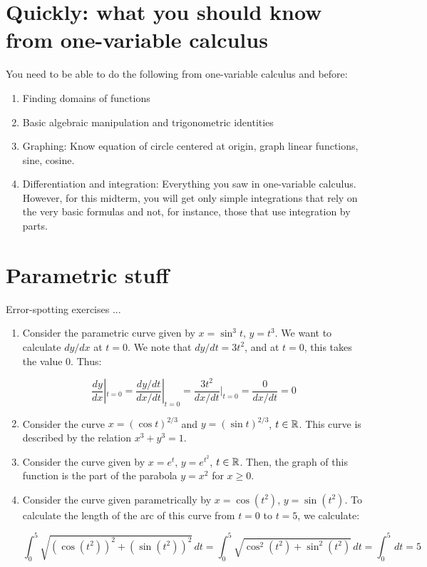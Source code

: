 \documentclass[10pt]{amsart}
\begin{document}
\section{Quickly: what you should know from one-variable calculus}

You need to be able to do the following from one-variable calculus and
before:

\begin{enumerate}
\item Finding domains of functions
\item Basic algebraic manipulation and trigonometric identities
\item Graphing: Know equation of circle centered at origin, graph
  linear functions, sine, cosine.
\item Differentiation and integration: Everything you saw in
  one-variable calculus. However, for this midterm, you will get only
  simple integrations that rely on the very basic formulas and not,
  for instance, those that use integration by parts.
\end{enumerate}

\section{Parametric stuff}

Error-spotting exercises ...

\begin{enumerate}
\item Consider the parametric curve given by $x = \sin^3 t$, $y =
  t^3$. We want to calculate $dy/dx$ at $t = 0$. We note that $dy/dt =
  3t^2$, and at $t = 0$, this takes the value $0$. Thus:

  $$\frac{dy}{dx}|_{t = 0} = \frac{dy/dt}{dx/dt}|_{t = 0} = \frac{3t^2}{dx/dt}|_{t = 0} = \frac{0}{dx/dt} = 0$$

\item Consider the curve $x = (\cos t)^{2/3}$ and $y = (\sin
  t)^{2/3}$, $t \in \mathbb{R}$. This curve is described by the relation $x^3
  + y^3 = 1$.

\item Consider the curve given by $x = e^t$, $y = e^{t^2}$, $t \in
  \mathbb{R}$. Then, the graph of this function is the part of the parabola $y =
  x^2$ for $x \ge 0$.

\item Consider the curve given parametrically by $x = \cos(t^2)$, $y =
  \sin(t^2)$. To calculate the length of the arc of this curve from $t
  = 0$ to $t = 5$, we calculate:

  $$\int_0^5 \sqrt{(\cos(t^2))^2 + (\sin(t^2))^2} \, dt = \int_0^5 \sqrt{\cos^2(t^2) + \sin^2(t^2)} \, dt = \int_0^5 \, dt = 5$$
\end{enumerate}
\end{document}
